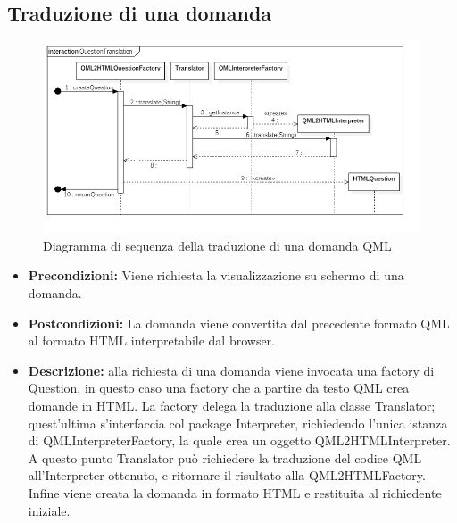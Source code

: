 \documentclass[a4paper,11pt]{article}
\begin{document}
	\subsection{Traduzione di una domanda}
	\begin{figure}[h!]
	\begin{center}
		\includegraphics[scale=0.5]{../images/QuestionTranslation.png}
		\caption{Diagramma di sequenza della traduzione di una domanda QML}
	\end{center}
	\end{figure}
	\begin{itemize}
	\item\textbf{Precondizioni:} Viene richiesta la visualizzazione su schermo di una domanda.
	\item\textbf{Postcondizioni:} La domanda viene convertita dal precedente formato QML al formato HTML interpretabile dal browser.
	\item\textbf{Descrizione:} alla richiesta di una domanda viene invocata una factory di Question, in questo caso una factory che a partire da testo QML crea domande in HTML. La factory delega la traduzione alla classe Translator; quest'ultima s'interfaccia col package Interpreter, richiedendo l'unica istanza di QMLInterpreterFactory, la quale crea un oggetto QML2HTMLInterpreter. A questo punto Translator può richiedere la traduzione del codice QML all'Interpreter ottenuto, e ritornare il risultato alla QML2HTMLFactory. Infine viene creata la domanda in formato HTML e restituita al richiedente iniziale.
	\end{itemize}
	\newpage
	
\end{document}
